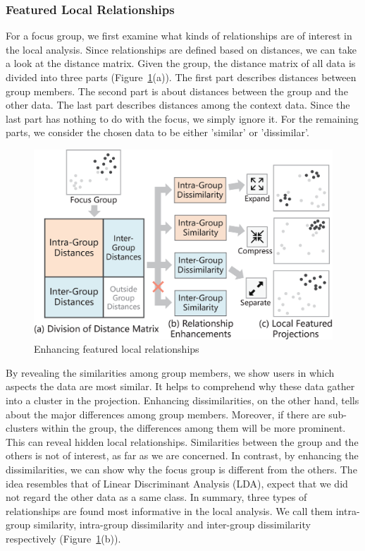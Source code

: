 \subsubsection{Featured Local Relationships}
For a focus group, we first examine what kinds of relationships are of interest in the local analysis. Since relationships are defined based on distances, we can take a look at the distance matrix. Given the group, the distance matrix of all data is divided into three parts (Figure~\ref{fig:local_relationships}(a)). The first part describes distances between group members. The second part is about distances between the group and the other data. The last part describes distances among the context data. Since the last part has nothing to do with the focus, we simply ignore it. For the remaining parts, we consider the chosen data to be either 'similar' or 'dissimilar'.

\begin{figure}[htbp]
\centering
\includegraphics[width=1\linewidth]{images/enhancement1.eps}
  \caption{Enhancing featured local relationships}
\label{fig:local_relationships}
  \end{figure}

By revealing the similarities among group members, we show users in which aspects the data are most similar. It helps to comprehend why these data gather into a cluster in the projection. Enhancing dissimilarities, on the other hand, tells about the major differences among group members. Moreover, if there are sub-clusters within the group, the differences among them will be more prominent. This can reveal hidden local relationships.  Similarities between the group and the others is not of interest, as far as we are concerned. In contrast, by enhancing the dissimilarities, we can show why the focus group is different from the others. The idea resembles that of Linear Discriminant Analysis (LDA), expect that we did not regard the other data as a same class. In summary, three types of relationships are found most informative in the local analysis. We call them intra-group similarity, intra-group dissimilarity and inter-group dissimilarity respectively (Figure~\ref{fig:local_relationships}(b)).

